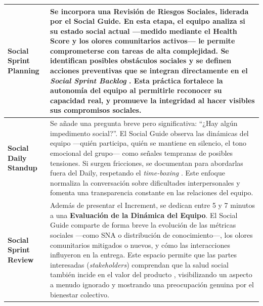 \begin{longtable}[H]{|
    >{\RaggedRight\hspace{0pt}}p{4.2cm}|   %
    >{\RaggedRight\hspace{0pt}}p{11.3cm}|  %
    }
    \hline
    \endlastfoot

    \textbf{Social Sprint Planning}      &
    Se incorpora una \textbf{Revisión de Riesgos Sociales}, liderada por el Social Guide. En esta etapa, el equipo analiza si su estado social actual —medido mediante el Health Score y los olores comunitarios activos— le permite comprometerse con tareas de alta complejidad. Se identifican posibles obstáculos sociales y se definen acciones preventivas que se integran directamente en el \textit{Social Sprint Backlog} \cite{schwaber2020scrum}.
    Esta práctica fortalece la \textbf{autonomía} del equipo al permitirle reconocer su capacidad real, y promueve la \textbf{integridad} al hacer visibles sus compromisos sociales.                                                                                                    \\[1pt]
    \hline

    \textbf{Social Daily Standup}        &
    Se añade una pregunta breve pero significativa: ``¿Hay algún impedimento social?''.
    El Social Guide observa las dinámicas del equipo —quién participa, quién se mantiene en silencio, el tono emocional del grupo— como señales tempranas de posibles tensiones. Si surgen fricciones, se documentan para abordarlas fuera del Daily, respetando el \textit{time-boxing} \cite{saeeda2024nontechnicaldebt}.
    Este enfoque normaliza la conversación sobre dificultades interpersonales y fomenta una transparencia constante en las relaciones del equipo.                                                                                                                                        \\[1pt]
    \hline

    \textbf{Social Sprint Review}        &
    Además de presentar el Increment, se dedican entre 5 y 7 minutos a una \textbf{Evaluación de la Dinámica del Equipo}.
    El Social Guide comparte de forma breve la evolución de las métricas sociales —como SNA o distribución de conocimiento—, los olores comunitarios mitigados o nuevos, y cómo las interacciones influyeron en la entrega.
    Este espacio permite que las partes interesadas (\textit{stakeholders}) comprendan que la salud social también incide en el valor del producto \cite{schwaber2020scrum}, visibilizando un aspecto a menudo ignorado y mostrando una preocupación genuina por el bienestar colectivo. \\[1pt]
    \hline


\end{longtable}
